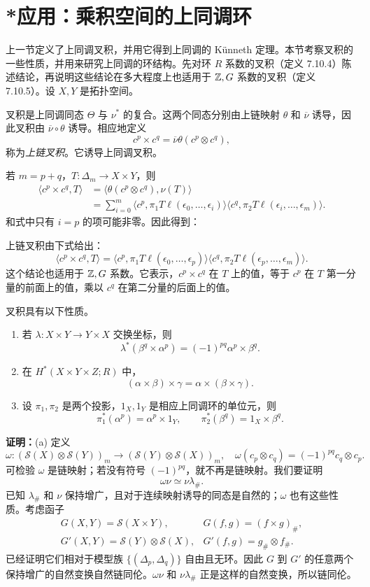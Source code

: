 \section{*应用：乘积空间的上同调环}
上一节定义了上同调叉积，并用它得到上同调的 Künneth 定理。本节考察叉积的一些性质，并用来研究上同调的环结构。先对环 $R$ 系数的叉积（定义 7.10.4）陈述结论，再说明这些结论在多大程度上也适用于 $\mathbb{Z},G$ 系数的叉积（定义 7.10.5）。设 $X,Y$ 是拓扑空间。

叉积是上同调同态 $\Theta$ 与 $\nu^*$ 的复合。这两个同态分别由上链映射 $\theta$ 和 $\overline\nu$ 诱导，因此叉积由 $\overline\nu\circ\theta$ 诱导。相应地定义
\[
c^p\times c^q=\overline\nu\theta(c^p\otimes c^q),
\]
称为\emph{上链叉积}。它诱导上同调叉积。

若 $m=p+q$，$T:\Delta_m\to X\times Y$，则
\begin{align*}
\langle c^p\times c^q,T\rangle
&=\langle\theta(c^p\otimes c^q),\nu(T)\rangle\\
&=\sum_{i=0}^m\langle c^p,\pi_1T\ell(\epsilon_0,\ldots,\epsilon_i)\rangle
\langle c^q,\pi_2T\ell(\epsilon_i,\ldots,\epsilon_m)\rangle.
\end{align*}
和式中只有 $i=p$ 的项可能非零。因此得到：

上链叉积由下式给出：
\[
\langle c^p\times c^q,T\rangle=
\langle c^p,\pi_1T\ell(\epsilon_0,\ldots,\epsilon_p)\rangle
\langle c^q,\pi_2T\ell(\epsilon_p,\ldots,\epsilon_m)\rangle.
\]
这个结论也适用于 $\mathbb{Z},G$ 系数。它表示，$c^p\times c^q$ 在 $T$ 上的值，等于 $c^p$ 在 $T$ 第一分量的前面上的值，乘以 $c^q$ 在第二分量的后面上的值。

叉积具有以下性质。
\begin{enumerate}[label=(\alph*)]
\item 若 $\lambda:X\times Y\to Y\times X$ 交换坐标，则
\[\lambda^*(\beta^q\times\alpha^p)=(-1)^{pq}\alpha^p\times\beta^q.\]
\item 在 $H^*(X\times Y\times Z;R)$ 中，
\[(\alpha\times\beta)\times\gamma=\alpha\times(\beta\times\gamma).\]
\item 设 $\pi_1,\pi_2$ 是两个投影，$1_X,1_Y$ 是相应上同调环的单位元，则
\[\pi_1^*(\alpha^p)=\alpha^p\times1_Y,\qquad \pi_2^*(\beta^q)=1_X\times\beta^q.\]
\end{enumerate}

\textbf{证明：}(a) 定义
\[
\omega:(\mathcal S(X)\otimes\mathcal S(Y))_m\to(\mathcal S(Y)\otimes\mathcal S(X))_m,
\quad\omega(c_p\otimes c_q)=(-1)^{pq}c_q\otimes c_p.
\]
可检验 $\omega$ 是链映射；若没有符号 $(-1)^{pq}$，就不再是链映射。我们要证明
\[
\omega\nu\simeq\nu\lambda_\#.
\]
已知 $\lambda_\#$ 和 $\nu$ 保持增广，且对于连续映射诱导的同态是自然的；$\omega$ 也有这些性质。考虑函子
\[
\begin{array}{ll}
G(X,Y)=\mathcal S(X\times Y),&G(f,g)=(f\times g)_\#,\\
G'(X,Y)=\mathcal S(Y)\otimes\mathcal S(X),&G'(f,g)=g_\#\otimes f_\#.
\end{array}
\]
已经证明它们相对于模型族 $\{(\Delta_p,\Delta_q)\}$ 自由且无环。因此 $G$ 到 $G'$ 的任意两个保持增广的自然变换自然链同伦。$\omega\nu$ 和 $\nu\lambda_\#$ 正是这样的自然变换，所以链同伦。

